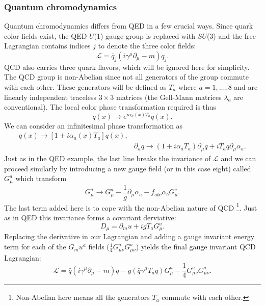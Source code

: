 \subsubsection{Quantum chromodynamics}
Quantum chromodynamics differs from QED in a few crucial ways. Since quark color fields exist, the QED $U$(1) gauge group is replaced with $SU$(3) and the free Lagrangian contains indices $j$ to denote the three color fields: 
\begin{equation}
\mathcal{L} = \bar{q}_j(i\gamma^\mu\partial_\mu - m)q_j.
\end{equation}
QCD also carries three quark flavors, which will be ignored here for simplicity. The QCD group is non-Abelian since not all generators of the group commute with each other. These generators will be defined as $T_a$ where $a=1,...,8$ and are linearly independent traceless $3\times3$ matrices (the Gell-Mann matrices $\lambda_a$ are conventional). The local color phase transformation required is thus 
\begin{equation}
q(x) \rightarrow e^{i\alpha_a(x)T_a}q(x).
\end{equation}
We can consider an infinitesimal phase transformation as 
\begin{equation}
\begin{split}
q(x) \rightarrow [1+i\alpha_a(x)T_a]q(x), \\
& \partial_uq \rightarrow (1+i\alpha_aT_a)\partial_\mu q + i T_a q \partial_\mu \alpha_a.
\end{split}
\end{equation}
Just as in the QED example, the last line breaks the invariance of $\mathcal{L}$ and we can proceed similarly by introducing a new gauge field (or in this case eight) called $G_\mu^a$ which transform 
\begin{equation}
G_\mu^a \rightarrow G_\mu^a - \frac{1}{g}\partial_\mu\alpha_a - f_{abc}\alpha_b G_\mu^c.
\end{equation}
The last term added here is to cope with the non-Abelian nature of QCD \footnote{Non-Abelian here means all the generators $T_a$ commute with each other.}. Just as in QED this invariance forms a covariant derviative:
\begin{equation}
D_\mu = \partial_mu + i g T_aG_\mu^a.
\end{equation}
Replacing the derivative in our Lagrangian and adding a gauge invariant energy term for each of the $G_mu^a$ fields ($\frac{1}{4}G_{\mu\nu}^a G_{\mu\nu}^a$) yields the final gauge invariant QCD Lagrangian:
\begin{equation}
\mathcal{L} = \bar{q}(i\gamma^\mu\partial_\mu - m)q - g(\bar{q}\gamma^\mu T_aq)G_\mu^a-\frac{1}{4}G_{\mu\nu}^aG_{\mu\nu}^a.
\end{equation}
